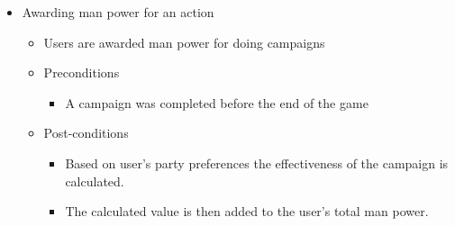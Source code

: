 \documentclass{article}
\begin{document}
	\begin{itemize}
		\item Awarding man power for an action
			\begin{itemize}
				\item Users are awarded man power for doing campaigns 
				\item Preconditions
				\begin{itemize}	
					\item A campaign was completed before the end of the game
				\end{itemize}
				\item Post-conditions
				\begin{itemize}	
					\item Based on user's party preferences the effectiveness of the campaign is calculated.
					\item The calculated value is then added to the user's total man power.
				\end{itemize}
			\end{itemize}
	\end{itemize}

	
	
\end{document}
